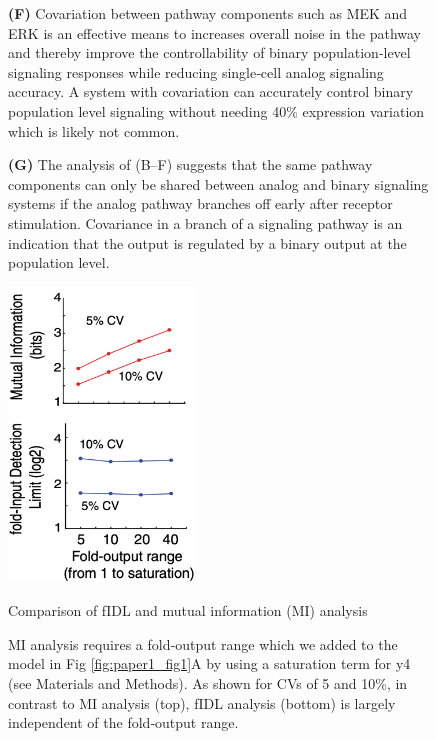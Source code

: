 \begin{figure}[hbt!]
{\textbf{(F)} Covariation between pathway components such as MEK and ERK is an effective means to increases overall noise in the pathway and thereby improve the controllability of binary population‐level signaling responses while reducing single‐cell analog signaling accuracy. A system with covariation can accurately control binary population level signaling without needing 40\% expression variation which is likely not common.

\textbf{(G)} The analysis of (B–F) suggests that the same pathway components can only be shared between analog and binary signaling systems if the analog pathway branches off early after receptor stimulation. Covariance in a branch of a signaling pathway is an indication that the output is regulated by a binary output at the population level.
}
\label{fig:paper1_fig8}
\end{figure}


\beginsupplement


\begin{figure}[hbt!]
\centering
\includegraphics[width=5cm, keepaspectratio]{figs/paper1/figS1.png}
\caption{Comparison of fIDL and mutual information (MI) analysis}
\caption*{MI analysis requires a fold‐output range which we added to the model in Fig \ref{fig:paper1_fig1}A by using a saturation term for y4 (see Materials and Methods). As shown for CVs of 5 and 10\%, in contrast to MI analysis (top), fIDL analysis (bottom) is largely independent of the fold‐output range.
}
\label{fig:paper1_figS1}
\end{figure}

